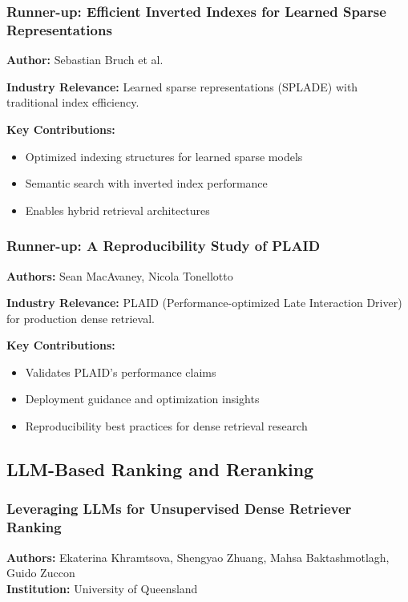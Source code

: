 \documentclass[11pt,letterpaper]{article}
\begin{document}
\subsubsection{Runner-up: Efficient Inverted Indexes for Learned Sparse Representations}
\textbf{Author:} Sebastian Bruch et al.

\textbf{Industry Relevance:} Learned sparse representations (SPLADE) with traditional index efficiency.

\textbf{Key Contributions:}
\begin{itemize}[leftmargin=*]
    \item Optimized indexing structures for learned sparse models
    \item Semantic search with inverted index performance
    \item Enables hybrid retrieval architectures
\end{itemize}

\subsubsection{Runner-up: A Reproducibility Study of PLAID}
\textbf{Authors:} Sean MacAvaney, Nicola Tonellotto

\textbf{Industry Relevance:} PLAID (Performance-optimized Late Interaction Driver) for production dense retrieval.

\textbf{Key Contributions:}
\begin{itemize}[leftmargin=*]
    \item Validates PLAID's performance claims
    \item Deployment guidance and optimization insights
    \item Reproducibility best practices for dense retrieval research
\end{itemize}

\subsection{LLM-Based Ranking and Reranking}

\subsubsection{Leveraging LLMs for Unsupervised Dense Retriever Ranking}
\textbf{Authors:} Ekaterina Khramtsova, Shengyao Zhuang, Mahsa Baktashmotlagh, Guido Zuccon\\
\textbf{Institution:} University of Queensland
\end{document}
